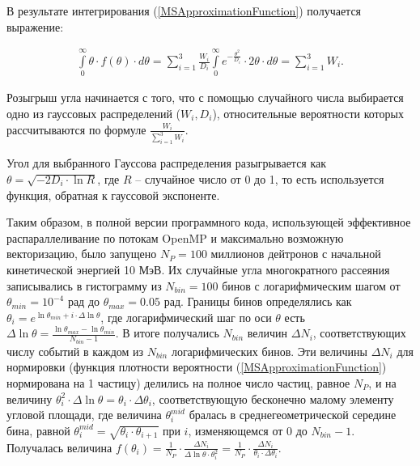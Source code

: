 \documentclass[a4paper,12pt]{article}
\begin{document}
\begin{large}
	В результате интегрирования (\ref{MSApproximationFunction}) получается выражение:
	
\begin{equation}
\label{MSApproximationFunctionIntegral}
\begin{aligned} 
  \int \limits_0^{\infty} \theta \cdot f(\theta) \cdot d\theta=\sum_{i=1}^{3} \frac{W_i}{D_i} \int \limits_0^{\infty} e^{-\frac{\theta^2}{D_i}} \cdot 2 \theta\cdot d\theta = \sum_{i=1}^{3} W_i.
\end{aligned}
\end{equation}

  	Розыгрыш угла начинается с того, что с помощью случайного числа выбирается одно из гауссовых распределений ($W_i,D_i$), относительные вероятности которых рассчитываются по формуле $\frac{W_i}{\sum_{i=1}^{3}W_i}$.
  
  	Угол для выбранного Гауссова распределения разыгрывается как $\theta=\sqrt{-2D_i\cdot\ln{R}}$, где $R$ -- случайное число от 0 до 1, то есть используется функция, обратная к гауссовой экспоненте.
  
 	Таким образом, в полной версии программного кода, использующей эффективное распараллеливание по потокам OpenMP и максимально возможную векторизацию, было запущено $N_P=100$ миллионов дейтронов с начальной кинетической энергией 10 МэВ.
 	Их случайные угла многократного рассеяния записывались в гистограмму из $N_{bin}=100$ бинов с логарифмическим шагом от $\theta_{min}=10^{-4}$ рад до $\theta_{max}=0.05$ рад.
 	Границы бинов определялись как $\theta_i=e^{\ln{\theta_{min}+i \cdot \Delta \ln{\theta}}}$, где логарифмический шаг по оси $\theta$ есть $\Delta \ln{\theta}=\frac{\ln{\theta_{max}}-\ln{\theta_{min}}}{N_{bin}-1}$.
 	В итоге получались $N_{bin}$ величин $\Delta N_i$, соответствующих числу событий в каждом из $N_{bin}$ логарифмических бинов.
 	Эти величины $\Delta N_i$ для нормировки (функция плотности вероятности (\ref{MSApproximationFunction}) нормирована на 1 частицу) делились на полное число частиц, равное $N_P$, и на величину $\theta_i^2 \cdot \Delta \ln{\theta}=\theta_i \cdot \Delta \theta_i$, соответствующую бесконечно малому элементу угловой площади, где величина $\theta^{mid}_i$ бралась в среднегеометрической середине бина, равной $\theta^{mid}_i=\sqrt{ \theta_i \cdot \theta_{i+1}}$ при $i$, изменяющемся от 0 до $N_{bin}-1$.
 	Получалась величина $f(\theta_i)=\frac{1}{N_P} \cdot \frac{\Delta N_i}{\Delta\ln{\theta} \cdot \theta^2_i}=\frac{1}{N_P} \cdot \frac{\Delta N_i}{\theta_i \cdot \Delta \theta_i}$.
  

\end{large}
\end{document}
